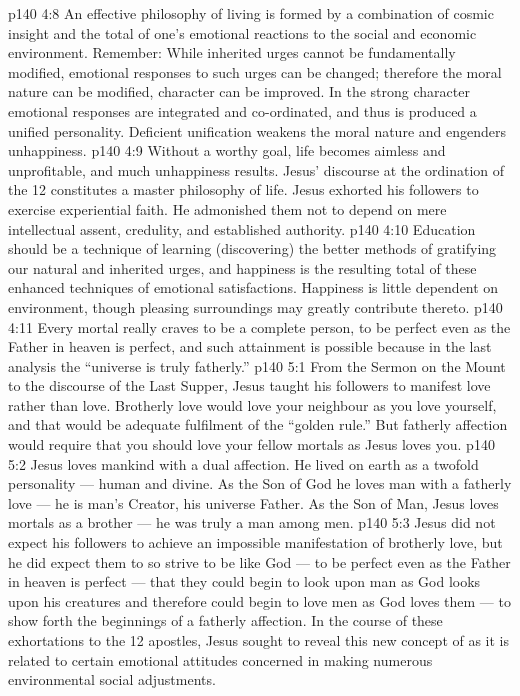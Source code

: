 \vs p140 4:8 \pc An effective philosophy of living is formed by a combination of cosmic insight and the total of one’s emotional reactions to the social and economic environment. Remember: While inherited urges cannot be fundamentally modified, emotional responses to such urges can be changed; therefore the moral nature can be modified, character can be improved. In the strong character emotional responses are integrated and co\hyp{}ordinated, and thus is produced a unified personality. Deficient unification weakens the moral nature and engenders unhappiness.
\vs p140 4:9 Without a worthy goal, life becomes aimless and unprofitable, and much unhappiness results. Jesus’ discourse at the ordination of the 12 constitutes a master philosophy of life. Jesus exhorted his followers to exercise experiential faith. He admonished them not to depend on mere intellectual assent, credulity, and established authority.
\vs p140 4:10 Education should be a technique of learning (discovering) the better methods of gratifying our natural and inherited urges, and happiness is the resulting total of these enhanced techniques of emotional satisfactions. Happiness is little dependent on environment, though pleasing surroundings may greatly contribute thereto.
\vs p140 4:11 \pc Every mortal really craves to be a complete person, to be perfect even as the Father in heaven is perfect, and such attainment is possible because in the last analysis the “universe is truly fatherly.”
\vs p140 5:1 From the Sermon on the Mount to the discourse of the Last Supper, Jesus taught his followers to manifest  love rather than  love. Brotherly love would love your neighbour as you love yourself, and that would be adequate fulfilment of the “golden rule.” But fatherly affection would require that you should love your fellow mortals as Jesus loves you.
\vs p140 5:2 Jesus loves mankind with a dual affection. He lived on earth as a twofold personality --- human and divine. As the Son of God he loves man with a fatherly love --- he is man’s Creator, his universe Father. As the Son of Man, Jesus loves mortals as a brother --- he was truly a man among men.
\vs p140 5:3 Jesus did not expect his followers to achieve an impossible manifestation of brotherly love, but he did expect them to so strive to be like God --- to be perfect even as the Father in heaven is perfect --- that they could begin to look upon man as God looks upon his creatures and therefore could begin to love men as God loves them --- to show forth the beginnings of a fatherly affection. In the course of these exhortations to the 12 apostles, Jesus sought to reveal this new concept of  as it is related to certain emotional attitudes concerned in making numerous environmental social adjustments.
